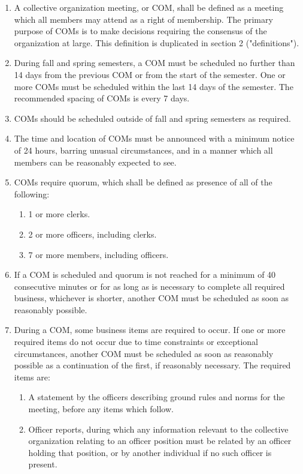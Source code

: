 \documentclass[11pt]{article}
\newcounter{h1}
\newcounter{h2}[h1]
\newcounter{h3}[h2]
\begin{document}

\begin{enumerate}
  \item A collective organization meeting, or COM, shall be defined as a meeting which all members may attend as a right of membership. The primary purpose of COMs is to make decisions requiring the consensus of the organization at large. This definition is duplicated in section 2 ("definitions").
  \item During fall and spring semesters, a COM must be scheduled no further than 14 days from the previous COM or from the start of the semester. One or more COMs must be scheduled within the last 14 days of the semester. The recommended spacing of COMs is every 7 days.
  \item COMs should be scheduled outside of fall and spring semesters as required.
  \item The time and location of COMs must be announced with a minimum notice of 24 hours, barring unusual circumstances, and in a manner which all members can be reasonably expected to see.
  \item COMs require quorum, which shall be defined as presence of all of the following:
  \begin{enumerate}
    \item 1 or more clerks.
    \item 2 or more officers, including clerks.
    \item 7 or more members, including officers.
  \end{enumerate}
  \item If a COM is scheduled and quorum is not reached for a minimum of 40 consecutive minutes or for as long as is necessary to complete all required business, whichever is shorter, another COM must be scheduled as soon as reasonably possible.
  \item During a COM, some business items are required to occur. If one or more required items do not occur due to time constraints or exceptional circumstances, another COM must be scheduled as soon as reasonably possible as a continuation of the first, if reasonably necessary. The required items are:
  \begin{enumerate}
    \item A statement by the officers describing ground rules and norms for the meeting, before any items which follow.
    \item Officer reports, during which any information relevant to the collective organization relating to an officer position must be related by an officer holding that position, or by another individual if no such officer is present.

\end{enumerate}
\end{enumerate}
\end{document}
